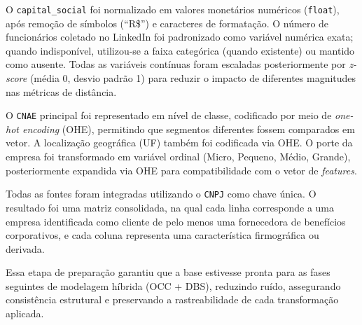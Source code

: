 O \texttt{capital\_social} foi normalizado em valores monetários numéricos (\texttt{float}), após remoção de símbolos (``R\$'') e caracteres de formatação. O número de funcionários coletado no LinkedIn foi padronizado como variável numérica exata; quando indisponível, utilizou-se a faixa categórica (quando existente) ou mantido como ausente. Todas as variáveis contínuas foram escaladas posteriormente por \textit{z-score} (média 0, desvio padrão 1) para reduzir o impacto de diferentes magnitudes nas métricas de distância.

O \texttt{CNAE} principal foi representado em nível de classe, codificado por meio de \textit{one-hot encoding} (OHE), permitindo que segmentos diferentes fossem comparados em vetor. A localização geográfica (UF) também foi codificada via OHE. O porte da empresa foi transformado em variável ordinal (Micro, Pequeno, Médio, Grande), posteriormente expandida via OHE para compatibilidade com o vetor de \textit{features}.

Todas as fontes foram integradas utilizando o \texttt{CNPJ} como chave única. O resultado foi uma matriz consolidada, na qual cada linha corresponde a uma empresa identificada como cliente de pelo menos uma fornecedora de benefícios corporativos, e cada coluna representa uma característica firmográfica ou derivada.

Essa etapa de preparação garantiu que a base estivesse pronta para as fases seguintes de modelagem híbrida (OCC + DBS), reduzindo ruído, assegurando consistência estrutural e preservando a rastreabilidade de cada transformação aplicada.